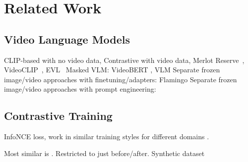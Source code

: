 \chapter{Related Work}
\label{chap:rel}

\section{Video Language Models}
\label{sec:vidlmb}

CLIP-based \citep{radford2021clip} with no video data, 
Contrastive with video data, Merlot Reserve~\cite{zellers2022mreserve}, VideoCLIP~\cite{xu2021videoclip}, EVL~\cite{lin2022evl}
Masked VLM: VideoBERT \citep{sun2019videobert}, VLM \citep{xu2021vlm}
Separate frozen image/video approaches with finetuning/adapters: Flamingo \citep{alayrac2022flamingo}
Separate frozen image/video approaches with prompt engineering: \citep{wang2022vidil, zeng2023socratic}


\section{Contrastive Training}
\label{sec:contrastive}

InfoNCE loss, work in similar training styles for different domains
\citep{momeni2023verbs, yuksekgonul2023when}.

Most similar is \cite{bagad2023testoftime}. Restricted to just before/after.
Synthetic dataset
